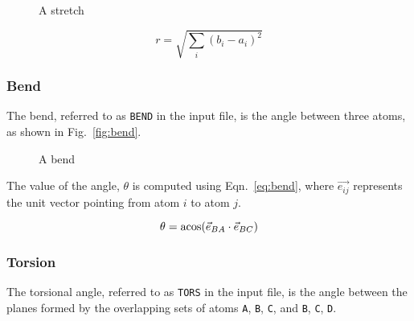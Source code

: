 \documentclass{article}
\begin{document}
\begin{figure}[ht]
  \centering
  \caption{A stretch}
  \label{fig:stre}

\end{figure}

\begin{equation}
  \label{eq:stre}
  r = \sqrt{\sum_i (b_i - a_i)^2}
\end{equation}

\subsubsection{Bend}
\label{sec:bend}

The bend, referred to as \verb|BEND| in the input file, is the angle between
three atoms, as shown in Fig.~\ref{fig:bend}.

\begin{figure}[ht]
  \centering
  \caption{A bend}
  \label{fig:stre}

\end{figure}

The value of the angle, $\theta$ is computed using Eqn.~\ref{eq:bend}, where
$\vec{e_{ij}}$ represents the unit vector pointing from atom $i$ to atom $j$.

\begin{equation}
  \label{eq:bend}
  \theta = \acos(\vec{e}_{BA} \cdot \vec{e}_{BC})
\end{equation}

\subsubsection{Torsion}
\label{sec:tors}

The torsional angle, referred to as \verb|TORS| in the input file, is the angle
between the planes formed by the overlapping sets of atoms \verb|A|, \verb|B|,
\verb|C|, and \verb|B|, \verb|C|, \verb|D|.
\end{document}
